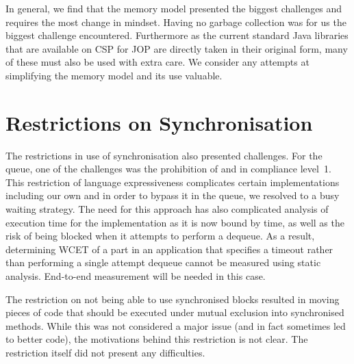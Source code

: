 In general, we find that the memory model presented the biggest challenges and requires the most change in mindset. Having no garbage collection was for us the biggest challenge encountered. Furthermore as the current standard Java libraries that are available on CSP for JOP are directly taken in their original form, many of these must also be used with extra care. We consider any attempts at simplifying the memory model and its use valuable.

 \section{Restrictions on Synchronisation} %
 \label{sec:restrictions_on_synchronisation}
The restrictions in use of synchronisation also presented challenges. For the queue, one of the challenges was the prohibition of \mbox{} and \mbox{} in compliance level~1. This restriction of language expressiveness complicates certain implementations including our own and in order to bypass it in the queue, we resolved to a busy waiting strategy. The need for this approach has also complicated analysis of execution time for the implementation as it is now bound by time, as well as the risk of being blocked when it attempts to perform a dequeue. As a result, determining WCET of a part in an application that specifies a timeout rather than performing a single attempt dequeue cannot be measured using static analysis. End-to-end measurement will be needed in this case.

The restriction on not being able to use synchronised blocks resulted in moving pieces of code that should be executed under mutual exclusion into synchronised methods. While this was not considered a major issue (and in fact sometimes led to better code), the motivations behind this restriction is not clear. The restriction itself did not present any difficulties.